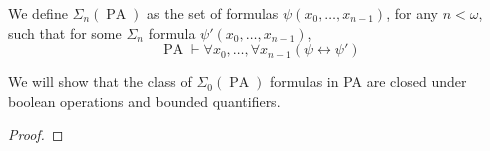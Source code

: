 \question{}
We define $\Sigma_n(\operatorname{PA})$ as the set of formulas $\psi(x_0, \ldots, x_{n - 1})$, for any $n < \omega$, such that for some $\Sigma_n$ formula $\psi'(x_0, \ldots, x_{n - 1})$,
\[
	\operatorname{PA}
	\vdash \forall x_0, \ldots, \forall x_{n - 1} (\psi \leftrightarrow \psi')
\]

\subquestion{}
We will show that the class of $\Sigma_0 (\operatorname{PA})$ formulas in PA are closed under boolean operations and bounded quantifiers.
\begin{proof}
	
\end{proof}


